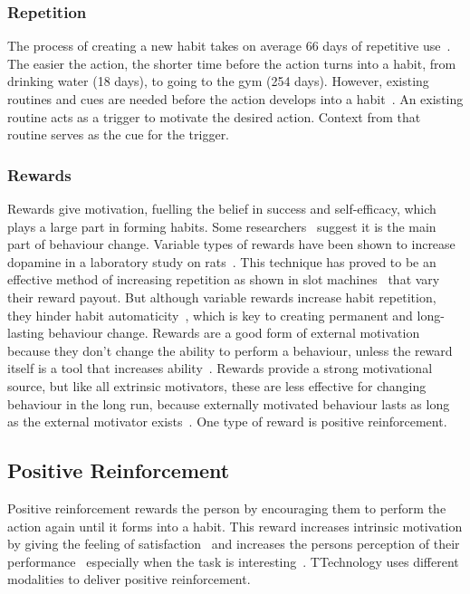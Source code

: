 \subsubsection*{Repetition}
The process of creating a new habit takes on average 66 days of repetitive use~\cite{article_how_habits_formed_modelling_habit_formation}. The easier the action, the shorter time before the action turns into a habit, from drinking water (18 days), to going to the gym (254 days). However, existing routines and cues are needed before the action develops into a habit~\cite{habits_event_cues_1, habits_event_cues_2}. An existing routine acts as a trigger to motivate the desired action. Context from that routine serves as the cue for the trigger.

\subsubsection*{Rewards}
Rewards give motivation, fuelling the belief in success and self-efficacy, which plays a large part in forming habits. Some researchers~\cite{article_a_self_efficacy} suggest it is the main part of behaviour change. Variable types of rewards have been shown to increase dopamine in a laboratory study on rats~\cite{variable_rewards_increases_dopamine}. This technique has proved to be an effective method of increasing repetition as shown in slot machines~\cite{programme_why_are_gambling_machines_addictive} that vary their reward payout. But although variable rewards increase habit repetition, they hinder habit automaticity~\cite{variable_rewards_increases_dopamine}, which is key to creating permanent and long-lasting behaviour change. Rewards are a good form of external motivation because they don't change the ability to perform a behaviour, unless the reward itself is a tool that increases ability~\cite{article_taxonomy_motivational_affordances_meaningful}. Rewards provide a strong motivational source, but like all extrinsic motivators, these are less effective for changing behaviour in the long run, because externally motivated behaviour lasts as long as the external motivator exists~\cite{article_beyond_self_tracking_designing_apps}. One type of reward is positive reinforcement.

\subsection{Positive Reinforcement}
Positive reinforcement rewards the person by encouraging them to perform the action again until it forms into a habit. This reward increases intrinsic motivation by giving the feeling of satisfaction~\cite{article_promoting_habit_formation} and increases the persons perception of their performance~\cite{positive_reinforcement_pro} especially when the task is interesting~\cite{article_meta_analytic_review_intrinsic_motivation}. TTechnology uses different modalities to deliver positive reinforcement.


